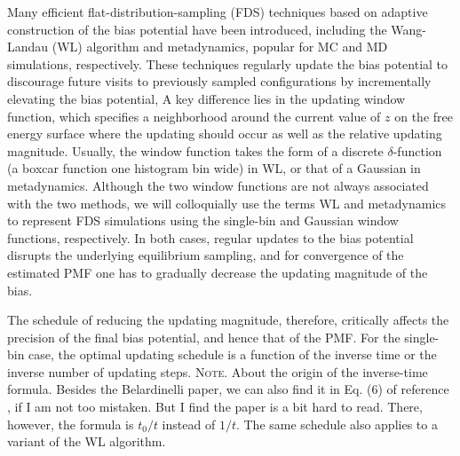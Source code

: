 \documentclass[reprint, superscriptaddress, floatfix]{revtex4-1}
\newcommand{\note}[1]{{\color{DarkGreen}\footnotesize \textsc{Note.} #1}}
\begin{document}
Many efficient flat-distribution-sampling (FDS) techniques
based on adaptive construction of the bias potential
have been introduced,
including the Wang-Landau (WL) algorithm\cite{
  wang2001, *wang2001pre}
and metadynamics\cite{huber1994,
*laio2002, *laio2008, *barducci2011, *sutto2012},
popular for MC and MD simulations, respectively\cite{junghans2014}.
%
%
These techniques regularly update the bias potential
to discourage future visits to previously sampled configurations
by incrementally elevating the bias potential,
%
%
A key difference lies
in the updating window function,
which specifies
a neighborhood around the current value of
$z$ on the free energy surface
where the updating should occur
as well as the relative updating magnitude.
%
Usually, the window function
takes the form of a discrete
$\delta$-function (a boxcar function one histogram bin wide)
in WL,
or that of a Gaussian
in metadynamics.
%
Although the two window functions
are not always associated with
the two methods\cite{micheletti2004, kim2006, *kim2007, junghans2014},
we will colloquially use the terms WL and metadynamics
to represent FDS simulations using the
single-bin and Gaussian window functions, respectively.
%
%
In both cases,
regular updates to the bias potential
disrupts the underlying equilibrium
sampling\cite{zhou2005, morozov2007, zhou2008},
and for convergence of the estimated PMF
one  has to gradually decrease
the updating magnitude of the bias.



The schedule of reducing
the updating magnitude,
therefore, critically affects
the precision of the final bias potential,
and hence that of the PMF\cite{laio2005, bussi2006, poulain2006,
belardinelli2007, *belardinelli2007jcp, *belardinelli2008, *belardinelli2016,
liang2007, min2007,
morozov2007, zhou2008,
komura2012, *caparica2012, *caparica2014,
barducci2008, dickson2011, dama2014}.
%
For the single-bin case, the optimal updating schedule
is a function of the
inverse time\cite{
belardinelli2007, *belardinelli2007jcp, *belardinelli2008, *belardinelli2016,
liang2007,
morozov2007, zhou2008}
or
the inverse number of updating steps.
\note{
  About the origin of the inverse-time formula.
  Besides the Belardinelli paper,
  we can also find it in Eq. (6) of reference \cite{liang2007},
  if I am not too mistaken.
  But I find the paper is a bit hard to read.
  There, however, the formula is $t_0/t$ instead of $1/t$.
}
The same schedule also applies to a variant of
the WL algorithm\cite{langfeld2012, pellegrini2014}.
%
\end{document}
